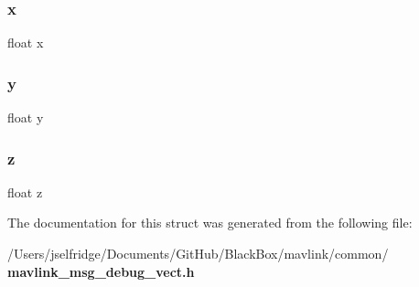 \mbox{\label{struct____mavlink__debug__vect__t_ad0da36b2558901e21e7a30f6c227a45e}} 
\subsubsection{x}
{\footnotesize\ttfamily float x}

\mbox{\label{struct____mavlink__debug__vect__t_aa4f0d3eebc3c443f9be81bf48561a217}} 
\subsubsection{y}
{\footnotesize\ttfamily float y}

\mbox{\label{struct____mavlink__debug__vect__t_af73583b1e980b0aa03f9884812e9fd4d}} 
\subsubsection{z}
{\footnotesize\ttfamily float z}



The documentation for this struct was generated from the following file\+:\begin{DoxyCompactItemize}
\item 
/\+Users/jselfridge/\+Documents/\+Git\+Hub/\+Black\+Box/mavlink/common/\textbf{ mavlink\+\_\+msg\+\_\+debug\+\_\+vect.\+h}\end{DoxyCompactItemize}
